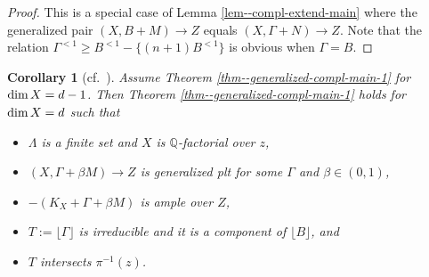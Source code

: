 \documentclass[12pt]{amsart}
\newtheorem{cor}[thm]{Corollary}
\theoremstyle{definition}
\begin{document}
\begin{proof}
This is a special case of Lemma \ref{lem--compl-extend-main} where the generalized pair $(X,B+M) \to Z$ equals $(X,\Gamma+N) \to Z$. 
Note that the relation $\Gamma^{<1}\geq B^{<1}-\{(n+1)B^{<1}\}$ is obvious when $\Gamma=B$. 
\end{proof}






\begin{cor}[cf.~{\cite[Proposition 4.1]{filipazzi-moraga}}]\label{cor--compl-extend-2}
Assume Theorem \ref{thm--generalized-compl-main-1} for ${\rm dim}\, X=d-1$. 
Then Theorem \ref{thm--generalized-compl-main-1} holds for ${\rm dim}\, X=d$ such that
\begin{itemize}
\item
$\Lambda$ is a finite set and $X$ is $\mathbb{Q}$-factorial over $z$, 
\item
$(X,\Gamma+\beta M) \to Z$ is generalized plt for some $\Gamma$ and $\beta \in (0,1)$,  
\item
$-(K_{X}+\Gamma+\beta M)$ is ample over $Z$, 
\item
$T:= \lfloor \Gamma \rfloor$ is irreducible and it is a component of $\lfloor B \rfloor$, and 
\item
$T$ intersects $\pi^{-1}(z)$. 
\end{itemize}  
\end{cor}
\end{document}
